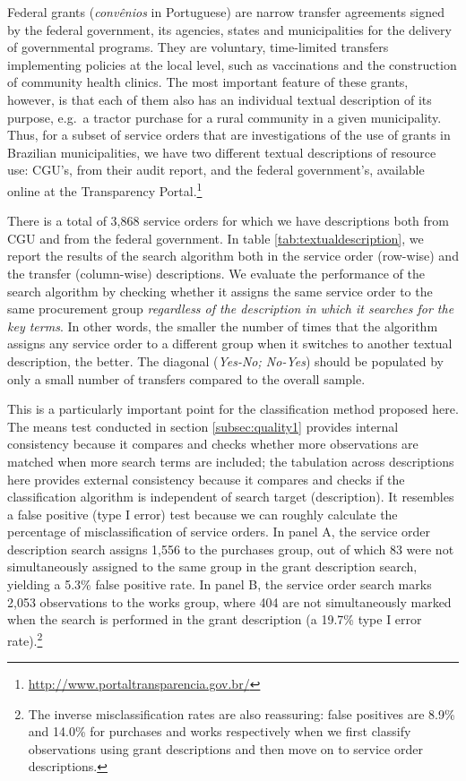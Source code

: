 \documentclass[11pt]{article}
\begin{document}
Federal grants (\emph{convênios} in Portuguese) are narrow transfer
agreements signed by the federal government, its agencies, states and
municipalities for the delivery of governmental programs. They are
voluntary, time-limited transfers implementing policies at the local
level, such as vaccinations and the construction of community health
clinics. The most important feature of these grants, however, is that
each of them also has an individual textual description of its purpose,
e.g.~a tractor purchase for a rural community in a given municipality.
Thus, for a subset of service orders that are investigations of the use
of grants in Brazilian municipalities, we have two
different textual descriptions of resource use: CGU's, from their audit
report, and the federal government's, available online at the
Transparency Portal.\footnote{\url{http://www.portaltransparencia.gov.br/}}


There is a total of 3,868 service orders for which we have descriptions both from CGU and from the federal government. In table \ref{tab:textualdescription}, we report the results of the search algorithm both in the service order (row-wise) and the transfer (column-wise) descriptions. We evaluate the performance of the search algorithm by checking whether it assigns the same service order to the same procurement group \emph{regardless of the description in which it searches for the key terms}. In other words, the smaller the number of times that the algorithm assigns any service order to a different group when it switches to another textual description, the better. The diagonal (\emph{Yes-No; No-Yes}) should be populated by only a small number of transfers compared to the overall sample.

This is a particularly important point for the classification method proposed here. The means test conducted in section \ref{subsec:quality1} provides internal consistency because it compares and checks whether more observations are matched when more search terms are included; the tabulation across descriptions here provides external consistency because it compares and checks if the classification algorithm is independent of search target (description). It resembles a false positive (type I error) test because we can roughly calculate the percentage of misclassification of service orders. In panel A, the service order description search assigns 1,556 to the purchases group, out of which 83 were not simultaneously assigned to the same group in the grant description search, yielding a 5.3\% false positive rate. In panel B, the service order search marks 2,053 observations to the works group, where 404 are not simultaneously marked when the search is performed in the grant description (a 19.7\% type I error rate).\footnote{The inverse misclassification rates are also reassuring: false positives are 8.9\% and 14.0\% for purchases and works respectively when we first classify observations using grant descriptions and then move on to service order descriptions.}
\end{document}
